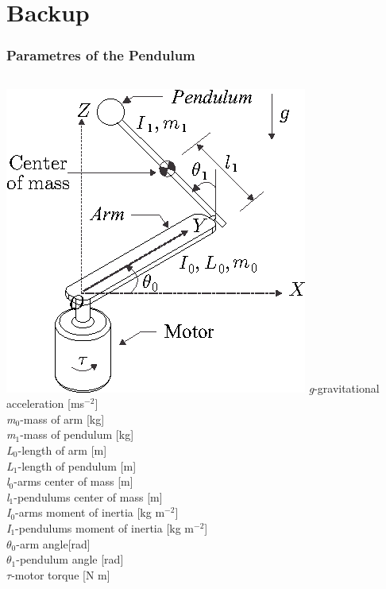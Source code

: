 \documentclass[]{beamer}
\begin{document}
\section{Backup}
\begin{frame}
	\frametitle{Parametres of the Pendulum}
	\begin{columns}[c]
		\column{2.3in}
		\centering
		\includegraphics[scale=0.55]{images/furuta.png}
		\column{2.7in}  %
		\textit{g}-gravitational acceleration [ms$^{-2}$]\\
		\textit{m}$_0$-mass of arm [kg]\\
		\textit{m}$_1$-mass of pendulum [kg]\\
		\textit{L}$_0$-length of arm [m]\\
		\textit{L}$_1$-length of pendulum [m]\\
		\textit{l}$_0$-arms center of mass [m]\\
		\textit{l}$_1$-pendulums center of mass [m]\\
		\textit{I}$_0$-arms moment of inertia [kg m$^{-2}$]\\
		\textit{I}$_1$-pendulums moment of inertia [kg m$^{-2}$]\\
		$\theta_0$-arm angle[rad]\\
		$\theta_1$-pendulum angle [rad]\\
		$\tau$-motor torque [N m]\\		
	\end{columns}
\end{frame}
\end{document}
